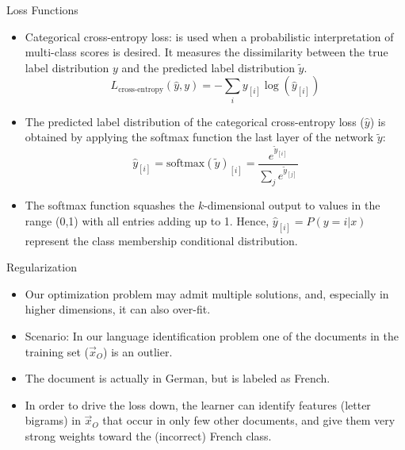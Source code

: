 \documentclass[handout]{beamer}
\begin{document}
\begin{frame}{Loss Functions}
\begin{scriptsize}
\begin{itemize}

 \item Categorical cross-entropy loss:  is used when a probabilistic interpretation of multi-class scores is desired. It measures the dissimilarity between the true label distribution $y$ and the predicted label distribution $\tilde{y}$. 
   \begin{displaymath}
  L_{\text{cross-entropy}}(\hat{y},y) = - \sum_{i} y_{[i]} \log(\hat{y}_{[i]})   
 \end{displaymath}
\item The predicted label distribution of the categorical cross-entropy loss ($\hat{y}$) is obtained by applying the softmax function the last layer of the network $\tilde{y}$:
    \begin{displaymath}
\hat{y}_{[i]} = \text{softmax}(\tilde{y})_{[i]} =  \frac{e^{\tilde{y}_{[i]}}}{\sum_{j}e^{\tilde{y}_{[j]}}}   
 \end{displaymath}
 
\item The softmax function squashes the $k$-dimensional output to values in the range (0,1) with all entries adding up to 1. Hence, $\hat{y}_{[i]} = P( y = i |x)$ represent the class membership conditional distribution.
 
\end{itemize}
\end{scriptsize}


\end{frame}





\begin{frame}{Regularization}
\begin{scriptsize}
\begin{itemize}
 \item Our optimization problem may admit multiple solutions, and, especially in higher dimensions, it can also over-fit.
 \item Scenario: In our language identification problem one of the documents in the training set ($\vec{x}_O$) is an outlier.
 \item The document is actually in German, but is labeled as French.
 
 \item In order to drive the loss down, the learner can identify features (letter bigrams) in $\vec{x}_O$ that occur in only few other documents, and give them very strong weights toward the (incorrect) French class. 

\end{itemize}
\end{scriptsize}

\end{frame}
\end{document}
